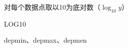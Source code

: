 \label{cmd:log10}

对每个数据点取以10为底对数（$\log_{10} y$）

\begin{SACSTX}
LOG10
\end{SACSTX}

depmin、depmax、depmen
